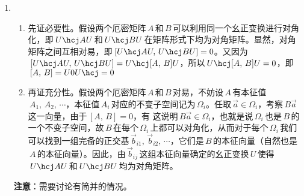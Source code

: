 \begin{enumerate}[label=2.\arabic*]
\item
\begin{enumerate}[label=(\arabic*)]
    \item 先证必要性。假设两个厄密矩阵$\,A\,$和$\,B\,$可以利用同一个幺正变换进行对角化，即$\,U\hcj AU\,$和$\,U\hcj BU\,$在矩阵形式下均为对角矩阵。显然，对角矩阵之间互相对易，即$\,[U\hcj AU,\,U\hcj BU]=0$。又因为$\,[U\hcj AU,\,U\hcj BU]=U\hcj[A,\,B]U$，所以$\,U\hcj[A,\,B]U=0$，即$\,[A,\,B]=U0U\hcj=0$
    \item 再证充分性。假设两个厄密矩阵$\,A\,$和$\,B\,$对易，不妨设$\,A\,$有本征值$\,A_1,\,A_2,\,\cdots$，本征值$\,A_i\,$对应的不变子空间记为$\,\varOmega_i$。任取$\,\vec{a}\in\varOmega_i$，考察$\,B\vec{a}\,$这一向量，由于$\,[A,\,B]=0$，有
    这说明$\,B\vec{a}\in\varOmega_i$，也就是说$\,\varOmega_i\,$也是$\,B\,$的一个不变子空间，故$\,B\,$在每个$\,\varOmega_i\,$上都可以对角化，从而对于每个$\,\varOmega_i\,$我们可以找到一组完备的正交基$\,\vec{b}_{i1},\,\vec{b}_{i2},\,\cdots$，它们是$\,B\,$的本征向量（自然也是$\,A\,$的本征向量）。因此，由$\,\vec{b}_{ij}\,$这组本征向量确定的幺正变换$\,U\,$使得$\,U\hcj AU\,$和$\,U\hcj BU\,$均为对角矩阵。
\end{enumerate}
{\color{red}\textbf{注意}：需要讨论有简并的情况。}


\end{enumerate}
